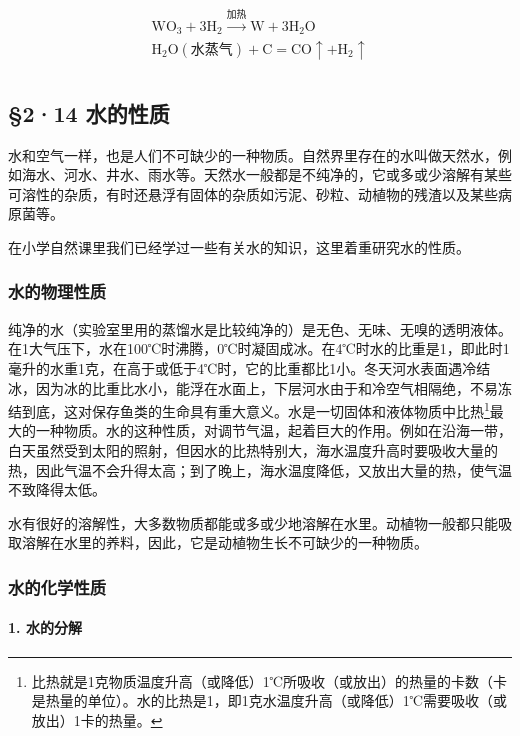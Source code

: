 \[
\begin{array}{l} \mathrm{WO}_{3} + 3 \mathrm{H}_{2} \xrightarrow {\text{加热}} \mathrm{W} + 3 \mathrm{H}_{2} \mathrm{O} \\ \mathrm{H}_{2} \mathrm{O} (\text{水蒸气}) + \mathrm{C} = \mathrm{CO} \uparrow + \mathrm{H}_{2} \uparrow \\ \end{array}
\]

\subsection{§2·14 水的性质}

水和空气一样，也是人们不可缺少的一种物质。自然界里存在的水叫做天然水，例如海水、河水、井水、雨水等。天然水一般都是不纯净的，它或多或少溶解有某些可溶性的杂质，有时还悬浮有固体的杂质如污泥、砂粒、动植物的残渣以及某些病原菌等。

在小学自然课里我们已经学过一些有关水的知识，这里着重研究水的性质。

\subsubsection{水的物理性质}

纯净的水（实验室里用的蒸馏水是比较纯净的）是无色、无味、无嗅的透明液体。在1大气压下，水在100℃时沸腾，0℃时凝固成冰。在4℃时水的比重是1，即此时1毫升的水重1克，在高于或低于4℃时，它的比重都比1小。冬天河水表面遇冷结冰，因为冰的比重比水小，能浮在水面上，下层河水由于和冷空气相隔绝，不易冻结到底，这对保存鱼类的生命具有重大意义。水是一切固体和液体物质中比热\footnote{比热就是1克物质温度升高（或降低）1℃所吸收（或放出）的热量的卡数（卡是热量的单位）。水的比热是1，即1克水温度升高（或降低）1℃需要吸收（或放出）1卡的热量。}最大的一种物质。水的这种性质，对调节气温，起着巨大的作用。例如在沿海一带，白天虽然受到太阳的照射，但因水的比热特别大，海水温度升高时要吸收大量的热，因此气温不会升得太高；到了晚上，海水温度降低，又放出大量的热，使气温不致降得太低。

水有很好的溶解性，大多数物质都能或多或少地溶解在水里。动植物一般都只能吸取溶解在水里的养料，因此，它是动植物生长不可缺少的一种物质。

\subsubsection{水的化学性质}

\paragraph{1. 水的分解}

